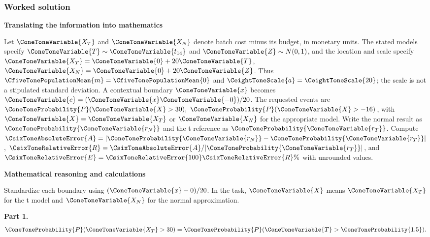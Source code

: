\subsubsection*{Worked solution}\label{sol:c9-d2}
\par\textbf{Translating the information into mathematics}\par
Let $\ConeToneVariable{X_T}$ and $\ConeToneVariable{X_N}$ denote batch cost minus its budget, in monetary units. The stated models specify $\ConeToneVariable{T}\sim \ConeToneVariable{t_{14}}$ and $\ConeToneVariable{Z}\sim N(0,1)$, and the location and scale specify $\ConeToneVariable{X_T}=\ConeToneVariable{0}+20\ConeToneVariable{T}$, $\ConeToneVariable{X_N}=\ConeToneVariable{0}+20\ConeToneVariable{Z}$. Thus $\CfiveTonePopulationMean{m}=\CfiveTonePopulationMean{0}$ and $\CeightToneScale{a}=\CeightToneScale{20}$; the scale is not a stipulated standard deviation. A contextual boundary $\ConeToneVariable{x}$ becomes $\ConeToneVariable{c}=(\ConeToneVariable{x}\ConeToneVariable{-0})/20$. The requested events are $\ConeToneProbability{P}(\ConeToneVariable{X}>30),\ \ConeToneProbability{P}(\ConeToneVariable{X}>-16)$, with $\ConeToneVariable{X}=\ConeToneVariable{X_T}$ or $\ConeToneVariable{X_N}$ for the appropriate model. Write the normal result as $\ConeToneProbability{\ConeToneVariable{r_N}}$ and the t reference as $\ConeToneProbability{\ConeToneVariable{r_T}}$. Compute $\CsixToneAbsoluteError{A}=|\ConeToneProbability{\ConeToneVariable{r_N}}-\ConeToneProbability{\ConeToneVariable{r_T}}|$, $\CsixToneRelativeError{R}=\CsixToneAbsoluteError{A}/|\ConeToneProbability{\ConeToneVariable{r_T}}|$, and $\CsixToneRelativeError{E}=\CsixToneRelativeError{100}\CsixToneRelativeError{R}\%$ with unrounded values.
\par\textbf{Mathematical reasoning and calculations}\par
Standardize each boundary using $(\ConeToneVariable{x}-0)/20$. In the task, $\ConeToneVariable{X}$ means $\ConeToneVariable{X_T}$ for the t model and $\ConeToneVariable{X_N}$ for the normal approximation.
\par\textbf{Part 1.}\[\ConeToneProbability{P}(\ConeToneVariable{X_T}>30)=\ConeToneProbability{P}(\ConeToneVariable{T}>\ConeToneProbability{1.5}).\]
